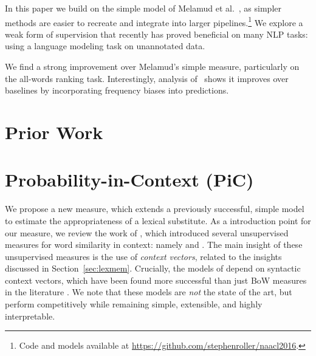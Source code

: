 In this paper we build on the simple model of Melamud et
al.~, as simpler methods are easier to recreate and
integrate into larger pipelines.\footnote{Code and models available at
\url{https://github.com/stephenroller/naacl2016}.}
We explore a weak form of supervision that recently has proved beneficial on
many NLP tasks: using a language modeling task on unannotated data.

We find a strong improvement over Melamud's simple measure, particularly on the
all-words ranking task.  Interestingly, analysis of \ourmeasparam~shows it
improves over baselines by incorporating frequency biases into predictions.



\section{Prior Work}

\section{Probability-in-Context (PiC)}

\hardline
We propose a new measure, which extends
a previously successful, simple model to estimate the appropriateness of a
lexical substitute. As a introduction point for our measure, we review the work
of , which introduced several unsupervised measures
for word similarity in context: namely \balAddCos and \addCos. The main insight
of these unsupervised measures is the use of {\em context vectors}, related
to the insights discussed in Section~\ref{sec:lexmem}. Crucially, the models
of  depend on syntactic context vectors, which
have been found more successful than just BoW measures in the literature
\cite{erk:2008:emnlp,dinu:2010:emnlp,thater:2010:acl,vandecruys:2011:emnlp}.
We note that these models are {\em not} the state of the art,
\cite{melamud:2015:naacl,melamud:2016:conll} but perform competitively while
remaining simple, extensible, and highly interpretable.

